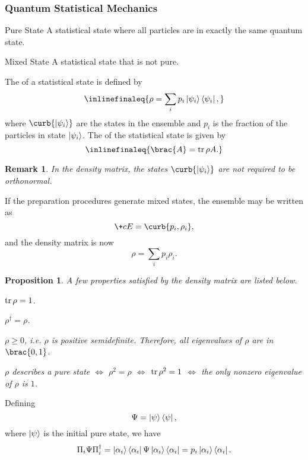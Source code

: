 \documentclass[hidelinks]{article}
\newtheorem{remark}{Remark}
\newtheorem{proposition}{Proposition}
\begin{document}

\subsubsection{Quantum Statistical Mechanics} %
\label{ssub:quantum_statistical_mechanics}

\begin{termdef}{Pure State}
    A statistical state where all particles are in exactly the same quantum state.
\end{termdef}
\begin{termdef}{Mixed State}
    A statistical state that is not pure.
\end{termdef}
The  of a statistical state is defined by
\[ \inlinefinaleq{\rho = \sum_i p_i \ket{\psi_i}\bra{\psi_i},} \]
where $\curb{\ket{\psi_i}}$ are the states in the ensemble and $p_i$ is the fraction of the particles in state $\ket{\psi_i}$.
The  of the statistical state is given by
\[ \inlinefinaleq{\brac{A} = \trace{\rho A}.} \]
\begin{remark}
    In the density matrix, the states $\curb{\ket{\psi_i}}$ are not required to be orthonormal.
\end{remark}
If the preparation procedures generate mixed states, the ensemble may be written as
\[ \+cE = \curb{p_i,\rho_i}, \]
and the density matrix is now
\[ \rho = \sum_i p_i \rho_i. \]
\begin{proposition}
    A few properties satisfied by the density matrix are listed below.
\begin{finale}
        \begin{cenum}
        \item $\trace \rho = 1$.
        \item $\rho^\dagger = \rho$.
        \item $\rho \ge 0$, i.e. $\rho$ is positive semidefinite. Therefore, all eigenvalues of $\rho$ are in $\brac{0,1}$.
        \item $\rho$ describes a pure state $\Leftrightarrow$ $\rho^2 = \rho$ $\Leftrightarrow$ $\trace{\rho^2} = 1$ $\Leftrightarrow$ the only nonzero eigenvalue of $\rho$ is $1$.
    \end{cenum}
\end{finale}
\end{proposition}
Defining
\[ \Psi = \ket{\psi}\bra{\psi}, \]
where $\ket{\psi}$ is the initial pure state, we have
\[ \Pi_i \Psi \Pi_i^\dagger = \ket{\alpha_i}\bra{\alpha_i}\Psi\ket{\alpha_i}\bra{\alpha_i} = p_i \ket{\alpha_i}\bra{\alpha_i}. \]
\end{document}

